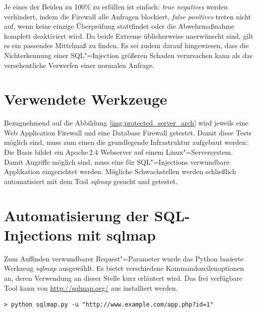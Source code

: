 Je eines der Beiden zu 100\% zu erfüllen ist einfach: \emph{true negatives} werden verhindert, indem die Firewall alle Anfragen blockiert, \emph{false positives} treten nicht auf, wenn keine einzige Überprüfung stattfindet oder die Abwehrmaßnahme komplett deaktiviert wird. Da beide Extreme üblicherweise unerwünscht sind, gilt es ein passendes Mittelmaß zu finden. Es sei zudem darauf hingewiesen, dass die Nichterkennung einer SQL"=Injection größeren Schaden verursachen kann als das versehentliche Verwerfen einer normalen Anfrage.

\section{Verwendete Werkzeuge}

Bezugnehmend auf die Abbildung \ref{img:protected_server_arch} wird jeweils eine Web Application Firewall und eine Database Firewall getestet. Damit diese Tests möglich sind, muss zum einen die grundlegende Infrastruktur aufgebaut werden: Die Basis bildet ein Apache\,2.4 Webserver auf einem Linux"=Serversystem. Damit Angriffe möglich sind, muss eine für SQL"=Injections verwundbare Applikation eingerichtet werden. Mögliche Schwachstellen werden schließlich automatisiert mit dem Tool \emph{sqlmap} gesucht und getestet.


\section{Automatisierung der SQL-Injections mit sqlmap}

Zum Auffinden verwundbarer Request"=Parameter wurde das Python basierte Werkzeug \emph{sqlmap} ausgewählt. Es bietet verschiedene Kommandozeilenoptionen an, deren Verwendung an dieser Stelle kurz erläutert wird. Das frei verfügbare Tool kann von \url{http://sqlmap.org/} aus installiert werden.

\begin{listing}
\begin{verbatim}
> python sqlmap.py -u "http://www.example.com/app.php?id=1"
\end{verbatim}
\end{listing}

